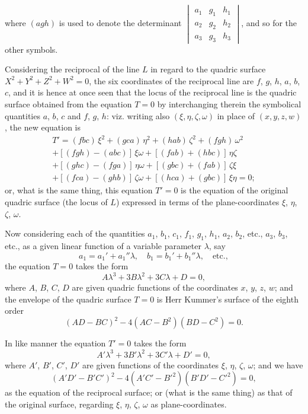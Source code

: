 \documentclass[12pt,a4paper]{article}
\theoremstyle{cayley}
\theoremstyle{definition}
\numberwithin{equation}{section}
\begin{document}
where $(agh)$ is used to denote the determinant $\begin{vmatrix} a_1 & g_1 & h_1 \\ a_2 & g_2 & h_2 \\ a_3 & g_3 & h_3 \end{vmatrix}$, and so for the other symbols.

Considering the reciprocal of the line $L$ in regard to the quadric surface $X^2 + Y^2 + Z^2 + W^2 = 0$, the six coordinates of the reciprocal line are $f$, $g$, $h$, $a$, $b$, $c$, and it is hence at once seen that the locus of the reciprocal line is the quadric surface obtained from the equation $T=0$ by interchanging therein the symbolical quantities $a$, $b$, $c$ and $f$, $g$, $h$: viz. writing also $(\xi, \eta, \zeta, \omega)$ in place of $(x, y, z, w)$, the new equation is
\begin{multline*}
T' = (fbc)\, \xi^2 + (gca)\, \eta^2 + (hab)\, \zeta^2 + (fgh)\, \omega^2 \\
+ [(fgh) - (abc)]\, \xi\omega + [(fab) + (hbc)]\, \eta\zeta \\
+ [(ghc) - (fga)]\, \eta\omega + [(gbc) + (fab)]\, \zeta\xi \\
+ [(fca) - (ghb)]\, \zeta\omega + [(hca) + (gbc)]\, \xi\eta = 0;
\end{multline*}
or, what is the same thing, this equation $T' = 0$ is the equation of the original quadric surface (the locus of $L$) expressed in terms of the plane-coordinates $\xi$, $\eta$, $\zeta$, $\omega$.

Now considering each of the quantities $a_1$, $b_1$, $c_1$, $f_1$, $g_1$, $h_1$, $a_2$, $b_2$, etc., $a_3$, $b_3$, etc., as a given linear function of a variable parameter $\lambda$, say
\[
a_1 = a_1' + a_1''\lambda, \quad b_1 = b_1' + b_1''\lambda, \quad \text{etc.},
\]
the equation $T=0$ takes the form
\[
A\lambda^3 + 3B\lambda^2 + 3C\lambda + D = 0,
\]
where $A$, $B$, $C$, $D$ are given quadric functions of the coordinates $x$, $y$, $z$, $w$; and the envelope of the quadric surface $T=0$ is Herr Kummer's surface of the eighth order
\[
(AD - BC)^2 - 4(AC - B^2)(BD - C^2) = 0.
\]

In like manner the equation $T' = 0$ takes the form
\[
A'\lambda^3 + 3B'\lambda^2 + 3C'\lambda + D' = 0,
\]
where $A'$, $B'$, $C'$, $D'$ are given functions of the coordinates $\xi$, $\eta$, $\zeta$, $\omega$; and we have
\[
(A'D' - B'C')^2 - 4(A'C' - B'^2)(B'D' - C'^2) = 0,
\]
as the equation of the reciprocal surface; or (what is the same thing) as that of the original surface, regarding $\xi$, $\eta$, $\zeta$, $\omega$ as plane-coordinates.
\end{document}
